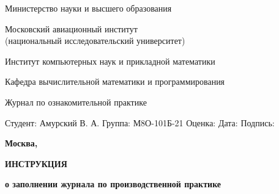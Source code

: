 \documentclass[12pt]{article}
\begin{document}
\begin{titlepage}
\begin{center}
\bfseries

{\Large Министерство науки и высшего образования}

\vspace{12pt}

{\Large Московский авиационный институт \\ (национальный исследовательский университет)}

\vspace{48pt}

\large Институт компьютерных наук и прикладной математики

\vspace{36pt}

\large Кафедра вычислительной математики и программирования

\vspace{72pt}

Журнал по ознакомительной практике \\

\end{center}

\vspace{180pt}

\begin{flushleft}
\hspace{350pt} Студент: Амурский В. А. 
\vspace{5pt}
\hspace{350pt} Группа: М8О-101Б-21 
\vspace{5pt}
\hspace{350pt} Оценка: 
\vspace{5pt}
\hspace{350pt} Дата: 
\vspace{5pt}
\hspace{350pt} Подпись:
\end{flushleft}

\vspace*{\fill}

\begin{center}
\bfseries
Москва, \the\year
\end{center}
\end{titlepage}

\begin{center}
\bfseries{\large ИНСТРУКЦИЯ }

\vspace{12pt}

\bfseries{о заполнении журнала по производственной практике}
\end{center}
\end{document}
